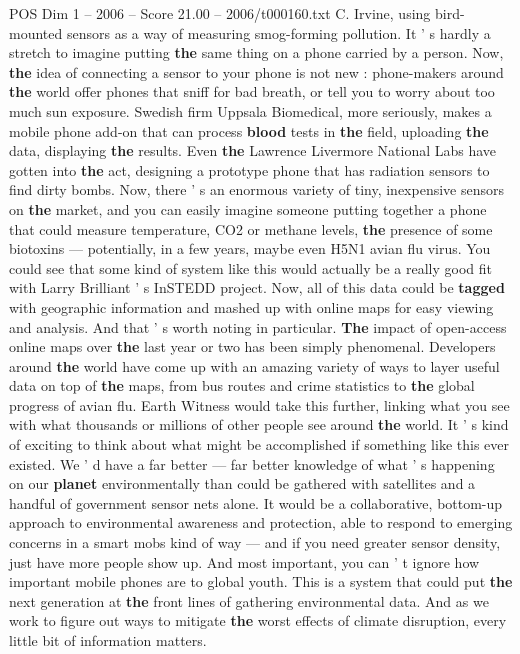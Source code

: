 \begin{textsample}{POS Dim 1 – 2006 – Score 21.00 – 2006/t000160.txt}
C.
Irvine, using bird-mounted sensors as a way of measuring smog-forming pollution.
It ' s hardly a stretch to imagine putting \textbf{the} same thing on a phone carried by a person.
Now, \textbf{the} idea of connecting a sensor to your phone is not new : phone-makers around \textbf{the} world offer phones that sniff for bad breath, or tell you to worry about too much sun exposure.
Swedish firm Uppsala Biomedical, more seriously, makes a mobile phone add-on that can process \textbf{blood} tests in \textbf{the} field, uploading \textbf{the} data, displaying \textbf{the} results.
Even \textbf{the} Lawrence Livermore National Labs have gotten into \textbf{the} act, designing a prototype phone that has radiation sensors to find dirty bombs.
Now, there ' s an enormous variety of tiny, inexpensive sensors on \textbf{the} market, and you can easily imagine someone putting together a phone that could measure temperature, CO2 or methane levels, \textbf{the} presence of some biotoxins — potentially, in a few years, maybe even H5N1 avian flu virus.
You could see that some kind of system like this would actually be a really good fit with Larry Brilliant ' s InSTEDD project.
Now, all of this data could be \textbf{tagged} with geographic information and mashed up with online maps for easy viewing and analysis.
And that ' s worth noting in particular. \textbf{The} impact of open-access online maps over \textbf{the} last year or two has been simply phenomenal.
Developers around \textbf{the} world have come up with an amazing variety of ways to layer useful data on top of \textbf{the} maps, from bus routes and crime statistics to \textbf{the} global progress of avian flu.
Earth Witness would take this further, linking what you see with what thousands or millions of other people see around \textbf{the} world.
It ' s kind of exciting to think about what might be accomplished if something like this ever existed.
We ' d have a far better — far better knowledge of what ' s happening on our \textbf{planet} environmentally than could be gathered with satellites and a handful of government sensor nets alone.
It would be a collaborative, bottom-up approach to environmental awareness and protection, able to respond to emerging concerns in a smart mobs kind of way — and if you need greater sensor density, just have more people show up.
And most important, you can ' t ignore how important mobile phones are to global youth.
This is a system that could put \textbf{the} next generation at \textbf{the} front lines of gathering environmental data.
And as we work to figure out ways to mitigate \textbf{the} worst effects of climate disruption, every little bit of information matters.

\end{textsample}
